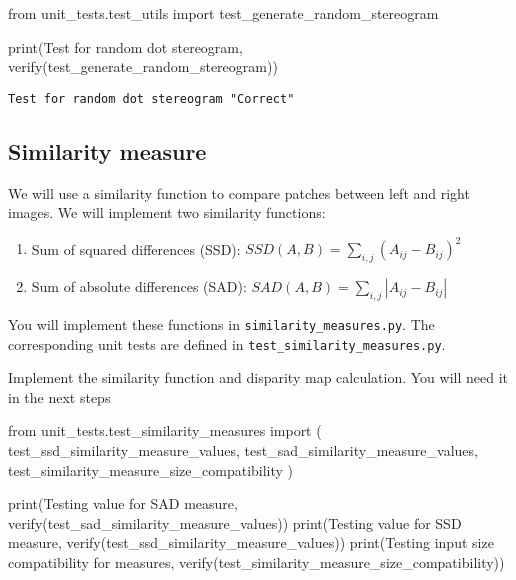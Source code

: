 \documentclass[
  letterpaper,
  DIV=11,
  numbers=noendperiod]{scrartcl}
\newenvironment{Shaded}{\begin{snugshade}}{\end{snugshade}}
\newcommand{\BuiltInTok}[1]{\textcolor[rgb]{0.00,0.23,0.31}{#1}}
\newcommand{\ImportTok}[1]{\textcolor[rgb]{0.00,0.46,0.62}{#1}}
\newcommand{\NormalTok}[1]{\textcolor[rgb]{0.00,0.23,0.31}{#1}}
\newcommand{\StringTok}[1]{\textcolor[rgb]{0.13,0.47,0.30}{#1}}
\providecommand{\tightlist}{%
  \setlength{\itemsep}{0pt}\setlength{\parskip}{0pt}}\usepackage{longtable,booktabs,array}
\begin{document}
\begin{Shaded}
\begin{Highlighting}[]
\ImportTok{from}\NormalTok{ unit\_tests.test\_utils }\ImportTok{import}\NormalTok{ test\_generate\_random\_stereogram}

\BuiltInTok{print}\NormalTok{(}\StringTok{\textquotesingle{}Test for random dot stereogram\textquotesingle{}}\NormalTok{, verify(test\_generate\_random\_stereogram))}
\end{Highlighting}
\end{Shaded}

\begin{verbatim}
Test for random dot stereogram "Correct"
\end{verbatim}

\hypertarget{similarity-measure}{%
\subsection{Similarity measure}\label{similarity-measure}}

We will use a similarity function to compare patches between left and
right images. We will implement two similarity functions:

\begin{enumerate}
\def\labelenumi{\arabic{enumi}.}
\tightlist
\item
  Sum of squared differences (SSD):
  \(SSD\left(A,B\right) = \sum_{i,j}\left(A_{ij} - B_{ij}\right)^2\)
\item
  Sum of absolute differences (SAD):
  \(SAD\left(A,B\right) = \sum_{i,j}|A_{ij} - B_{ij}|\)
\end{enumerate}

You will implement these functions in \texttt{similarity\_measures.py}.
The corresponding unit tests are defined in
\texttt{test\_similarity\_measures.py}.

Implement the similarity function and disparity map calculation. You
will need it in the next steps

\begin{Shaded}
\begin{Highlighting}[]
\ImportTok{from}\NormalTok{ unit\_tests.test\_similarity\_measures }\ImportTok{import}\NormalTok{ (}
\NormalTok{  test\_ssd\_similarity\_measure\_values, }
\NormalTok{  test\_sad\_similarity\_measure\_values, }
\NormalTok{  test\_similarity\_measure\_size\_compatibility}
\NormalTok{)}

\BuiltInTok{print}\NormalTok{(}\StringTok{\textquotesingle{}Testing value for SAD measure\textquotesingle{}}\NormalTok{, verify(test\_sad\_similarity\_measure\_values))}
\BuiltInTok{print}\NormalTok{(}\StringTok{\textquotesingle{}Testing value for SSD measure\textquotesingle{}}\NormalTok{, verify(test\_ssd\_similarity\_measure\_values))}
\BuiltInTok{print}\NormalTok{(}\StringTok{\textquotesingle{}Testing input size compatibility for measures\textquotesingle{}}\NormalTok{, verify(test\_similarity\_measure\_size\_compatibility))}

  
\end{Highlighting}
\end{Shaded}
\end{document}
